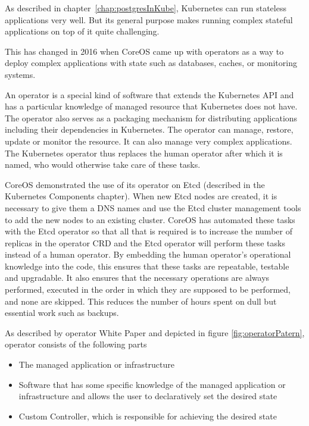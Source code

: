 \pagebreak
{}
\label{chap:operators}
As described in chapter~\ref{chap:postgresInKube}, Kubernetes can run stateless applications very well. But its general purpose makes running complex stateful applications on top of it quite challenging.


This has changed in 2016 when CoreOS came up with operators as a way to deploy complex applications with state such as databases, caches, or monitoring systems. \cite{IArchiveCOSoperators}

An operator is a special kind of software that extends the Kubernetes API and has a particular knowledge of managed resource that Kubernetes does not have. The operator also serves as a packaging mechanism for distributing applications including their dependencies in Kubernetes. The operator can manage, restore, update or monitor the resource. It can also manage very complex applications. The Kubernetes operator thus replaces the human operator after which it is named, who would otherwise take care of these tasks. \cite{operatorsPreface} \cite{IArchiveCOSoperators}


CoreOS demonstrated the use of its operator on Etcd (described in the Kubernetes Components chapter). When new Etcd nodes are created, it is necessary to give them a DNS names and use the Etcd cluster management tools to add the new nodes to an existing cluster. CoreOS has automated these tasks with the Etcd operator so that all that is required is to increase the number of replicas in the operator CRD and the Etcd operator will perform these tasks instead of a human operator. \cite{IArchiveCOSoperators}
By embedding the human operator's operational knowledge into the code, this ensures that these tasks are repeatable, testable and upgradable. It also ensures that the necessary operations are always performed, executed in the order in which they are supposed to be performed, and none are skipped. This reduces the number of hours spent on dull but essential work such as backups. \cite{operatorWhitepaper}

As described by operator White Paper \cite{operatorWhitepaper} and depicted in figure \ref{fig:operatorPatern}, operator consists of the following parts
\begin{itemize}
    \item The managed application or infrastructure
    \item Software that has some specific knowledge of the managed application or infrastructure and allows the user to declaratively set the desired state
    \item Custom Controller, which is responsible for achieving the desired state
\end{itemize}

